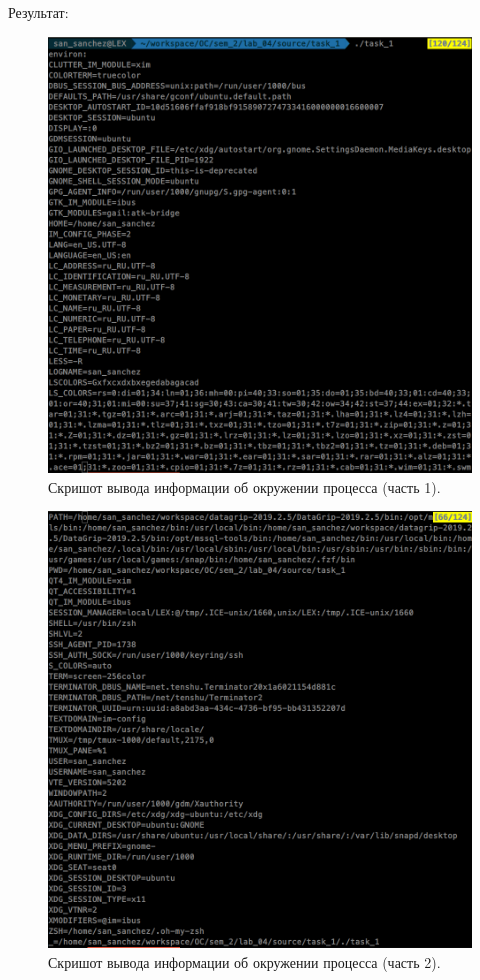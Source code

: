 Результат:
\begin{figure}[H]
    \centering
    \includegraphics[scale=0.45]{data/image/env_1.png}
    \caption{Скришот вывода информации об окружении процесса (часть 1).}
\end{figure}

\begin{figure}[H]
    \centering
    \includegraphics[scale=0.45]{data/image/env_2.png}
    \caption{Скришот вывода информации об окружении процесса (часть 2).}
\end{figure}

